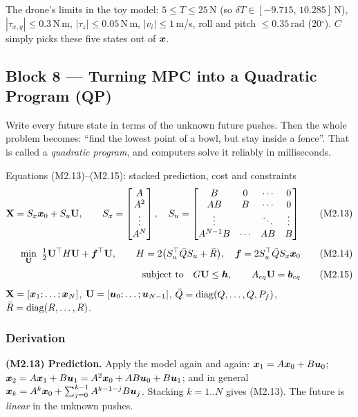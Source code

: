 The drone's limits in the toy model: $5\le T\le25$\,N (so $\delta T\in[-9.715,\,10.285]$\,N), $|\tau_{x,y}|\le0.3$\,N\,m,
$|\tau_z|\le0.05$\,N\,m, $|v_i|\le1$\,m/s, roll and pitch $\le0.35$\,rad (20$^\circ$). $C$ simply picks these five states out of $\bm{x}$.

\subsection{Block 8 --- Turning MPC into a Quadratic Program (QP)}
\label{sec:m2b8}

\begin{idea}
Write every future state in terms of the unknown future pushes. Then the whole problem becomes: ``find the lowest point of
a bowl, but stay inside a fence''. That is called a \emph{quadratic program}, and computers solve it reliably in
milliseconds.
\end{idea}

\begin{eqbox}{Equations (M2.13)--(M2.15): stacked prediction, cost and constraints}
\begin{align}
  \mathbf X=S_x\bm{x}_0+S_u\mathbf U,\qquad
  S_x=\begin{bmatrix}A\\ A^2\\ \vdots\\ A^N\end{bmatrix},\quad
  S_u=\begin{bmatrix}B&0&\cdots&0\\ AB&B&\cdots&0\\ \vdots&&\ddots&\vdots\\ A^{N-1}B&\cdots&AB&B\end{bmatrix} \tag{M2.13}\\[4pt]
  \min_{\mathbf U}\ \tfrac12\mathbf U^\top H\mathbf U+\bm f^\top\mathbf U,\qquad
  H=2\big(S_u^\top\bar QS_u+\bar R\big),\quad \bm f=2S_u^\top\bar QS_x\bm{x}_0 \tag{M2.14}\\[2pt]
  \text{subject to}\quad G\mathbf U\le\bm h,\qquad A_{eq}\mathbf U=\bm b_{eq} \tag{M2.15}
\end{align}
$\mathbf X=[\bm{x}_1;\dots;\bm{x}_N]$, $\mathbf U=[\bm{u}_0;\dots;\bm{u}_{N-1}]$, $\bar Q=\operatorname{diag}(Q,\dots,Q,P_f)$, $\bar R=\operatorname{diag}(R,\dots,R)$.
\end{eqbox}

\subsubsection*{Derivation}
\textbf{(M2.13) Prediction.} Apply the model again and again:
$\bm{x}_1=A\bm{x}_0+B\bm{u}_0$; $\bm{x}_2=A\bm{x}_1+B\bm{u}_1=A^2\bm{x}_0+AB\bm{u}_0+B\bm{u}_1$; and in general
$\bm{x}_k=A^k\bm{x}_0+\sum_{j=0}^{k-1}A^{k-1-j}B\bm{u}_j$. Stacking $k=1..N$ gives (M2.13). The future is \emph{linear} in the unknown
pushes.

